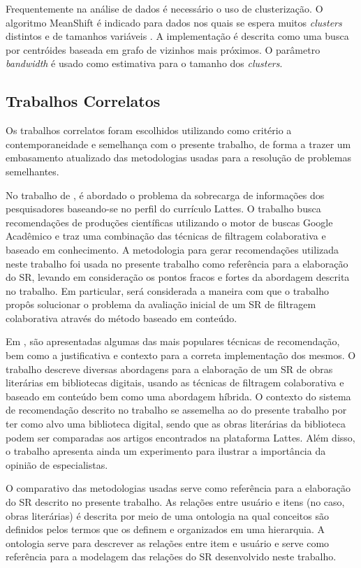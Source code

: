 \documentclass[12pt]{article}
\begin{document}
Frequentemente na análise de dados é necessário o uso de clusterização. O algoritmo MeanShift é indicado para dados nos quais se espera muitos \textit{clusters} distintos e de tamanhos variáveis \cite{scikit-learn}. A implementação é descrita como uma busca por centróides baseada em grafo de vizinhos mais próximos. O parâmetro \textit{bandwidth} é usado como estimativa para o tamanho dos \textit{clusters}.

\subsection{Trabalhos Correlatos}

Os trabalhos correlatos foram escolhidos utilizando como critério a contemporaneidade e semelhança com o presente trabalho, de forma a trazer um embasamento atualizado das metodologias usadas para a resolução de problemas semelhantes.

No trabalho de \cite{da2018desenvolvimento}, é abordado o problema da sobrecarga de informações dos pesquisadores baseando-se no perfil do currículo Lattes. O trabalho busca recomendações de produções científicas utilizando o motor de buscas Google Acadêmico e traz uma combinação das técnicas de filtragem colaborativa e baseado em conhecimento. A metodologia para gerar recomendações utilizada neste trabalho foi usada no presente trabalho como referência para a elaboração do SR, levando em consideração os pontos fracos e fortes da abordagem descrita no trabalho. Em particular, será considerada a maneira com que o trabalho propôs solucionar o problema  da avaliação inicial de um SR de filtragem colaborativa através do método baseado em conteúdo.

Em \cite{primo2006tecnicas}, são apresentadas algumas das mais populares técnicas de recomendação, bem como a justificativa e contexto para a 
correta implementação dos mesmos. O trabalho descreve diversas abordagens para a elaboração de um SR de obras literárias em bibliotecas digitais, usando as técnicas de filtragem colaborativa e baseado em conteúdo bem como uma abordagem híbrida. O contexto do sistema de recomendação descrito no trabalho se assemelha ao do presente trabalho por ter como alvo uma 
biblioteca digital, sendo que as obras literárias da biblioteca podem ser comparadas aos artigos encontrados na plataforma Lattes. Além disso, o trabalho apresenta ainda um experimento para ilustrar a importância da opinião de especialistas.

O comparativo das metodologias usadas serve como referência para a elaboração do SR descrito no presente trabalho. As relações entre usuário e itens (no caso, obras literárias) é descrita por meio de uma ontologia na qual conceitos são definidos pelos termos que os definem e organizados em uma hierarquia. A ontologia serve para descrever as relações entre item e usuário e serve como referência para a modelagem das relações do SR desenvolvido neste trabalho.
\end{document}
